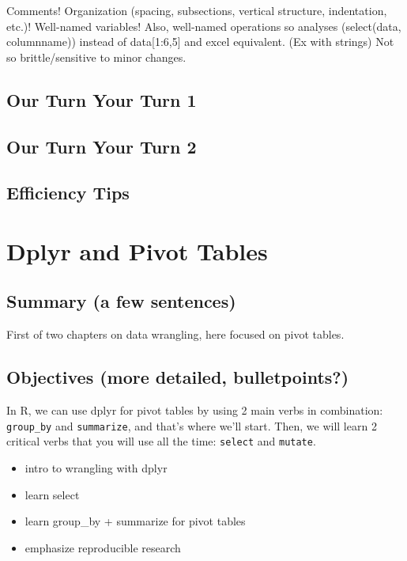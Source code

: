 \documentclass[]{book}
\providecommand{\tightlist}{%
  \setlength{\itemsep}{0pt}\setlength{\parskip}{0pt}}
\begin{document}
Comments! Organization (spacing, subsections, vertical structure, indentation, etc.)! Well-named variables! Also, well-named operations so analyses (select(data, columnname)) instead of data{[}1:6,5{]} and excel equivalent. (Ex with strings)
Not so brittle/sensitive to minor changes.

\hypertarget{our-turn-your-turn-1}{%
\section{Our Turn Your Turn 1}\label{our-turn-your-turn-1}}

\hypertarget{our-turn-your-turn-2}{%
\section{Our Turn Your Turn 2}\label{our-turn-your-turn-2}}

\hypertarget{efficiency-tips-2}{%
\section{Efficiency Tips}\label{efficiency-tips-2}}

\hypertarget{pivot}{%
\chapter{Dplyr and Pivot Tables}\label{pivot}}

\hypertarget{summary-a-few-sentences-2}{%
\section{Summary (a few sentences)}\label{summary-a-few-sentences-2}}

First of two chapters on data wrangling, here focused on pivot tables.

\hypertarget{objectives-more-detailed-bulletpoints-2}{%
\section{Objectives (more detailed, bulletpoints?)}\label{objectives-more-detailed-bulletpoints-2}}

In R, we can use dplyr for pivot tables by using 2 main verbs in combination: \texttt{group\_by} and \texttt{summarize}, and that's where we'll start. Then, we will learn 2 critical verbs that you will use all the time: \texttt{select} and \texttt{mutate}.

\begin{itemize}
\tightlist
\item
  intro to wrangling with dplyr
\item
  learn select
\item
  learn group\_by + summarize for pivot tables
\item
  emphasize reproducible research
\end{itemize}
\end{document}
